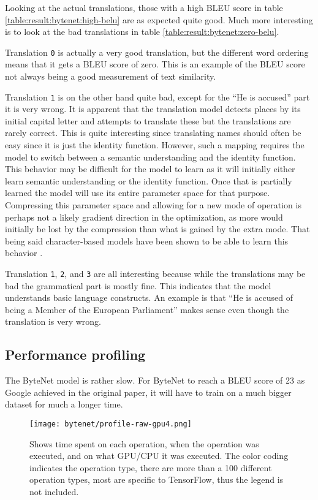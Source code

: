 Looking at the actual translations, those with a high BLEU score in table \ref{table:result:bytenet:high-belu} are as expected quite good. Much more interesting is to look at the bad translations in table \ref{table:result:bytenet:zero-belu}.

Translation \texttt{0} is actually a very good translation, but the different word ordering means that it gets a BLEU score of zero. This is an example of the BLEU score not always being a good measurement of text similarity.

Translation \texttt{1} is on the other hand quite bad, except for the ``He is accused'' part it is very wrong. It is apparent that the translation model detects places by its initial capital letter and attempts to translate these but the translations are rarely correct. This is quite interesting since translating names should often be easy since it is just the identity function. However, such a mapping requires the model to switch between a semantic understanding and the identity function. This behavior may be difficult for the model to learn as it will initially either learn semantic understanding or the identity function. Once that is partially learned the model will use its entire parameter space for that purpose. Compressing this parameter space and allowing for a new mode of operation is perhaps not a likely gradient direction in the optimization, as more would initially be lost by the compression than what is gained by the extra mode. That being said character-based models have been shown to be able to learn this behavior \cite{character-alignment}.

Translation \texttt{1}, \texttt{2}, and \texttt{3} are all interesting because while the translations may be bad the grammatical part is mostly fine. This indicates that the model understands basic language constructs. An example is that ``He is accused of being a Member of the European Parliament'' makes sense even though the translation is very wrong.

\clearpage
\subsection{Performance profiling}
The ByteNet model is rather slow. For ByteNet to reach a BLEU score of 23 as Google achieved in the original paper, it will have to train on a much bigger dataset for much a longer time.

\begin{figure}[h]
    \centering
    \texttt{[image: bytenet/profile-raw-gpu4.png]}
    \caption{Shows time spent on each operation, when the operation was executed, and on what GPU/CPU it was executed. The color coding indicates the operation type, there are more than a 100 different operation types, most are specific to TensorFlow, thus the legend is not included.}
    \label{fig:result:bytenet:profile-raw}
\end{figure}

